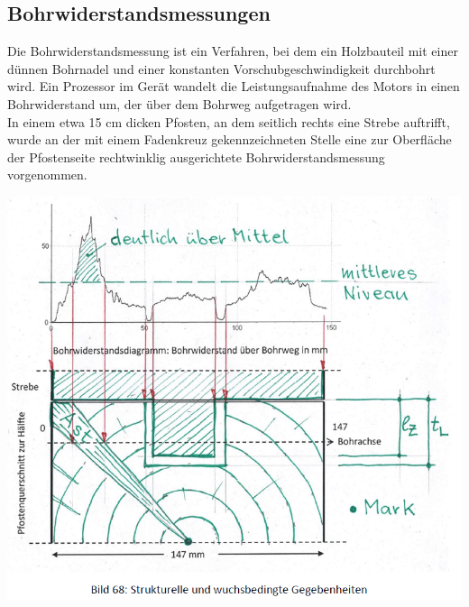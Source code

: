 \documentclass[fleqn,twoside]{article}
\begin{document}
    \subsection{Bohrwiderstandsmessungen}
        \begin{minipage}{0.55\textwidth}
        Die Bohrwiderstandsmessung ist ein Verfahren, bei dem ein Holzbauteil mit einer dünnen Bohrnadel
        und einer konstanten Vorschubgeschwindigkeit durchbohrt wird. Ein Prozessor im Gerät wandelt die
        Leistungsaufnahme des Motors in einen Bohrwiderstand um, der über dem Bohrweg aufgetragen wird.\\
        In einem etwa 15 cm dicken Pfosten, an dem seitlich rechts eine Strebe auftrifft, wurde an der mit
        einem Fadenkreuz gekennzeichneten Stelle eine zur Oberfläche der Pfostenseite rechtwinklig ausgerichtete
        Bohrwiderstandsmessung vorgenommen.
        \end{minipage}
        \begin{minipage}{0.45\textwidth}
        \includegraphics[width=1\textwidth]{Grafiken/Beurteilen alter Holzkonstruktionen/Bohrwiderstandsmessung.png}
        \end{minipage}
\end{document}
